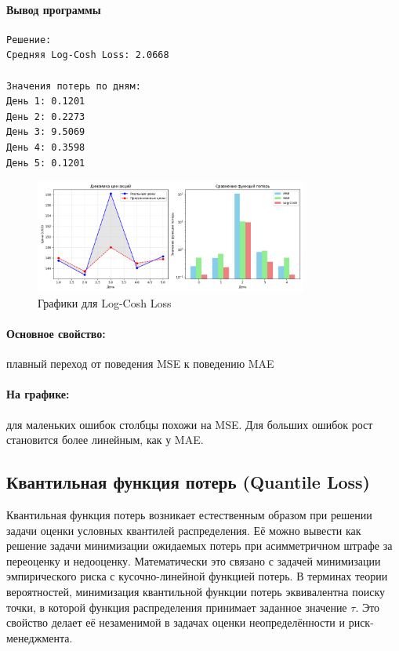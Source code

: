 \documentclass[12pt]{article}
\theoremstyle{definition}
\theoremstyle{definition}
\theoremstyle{definition}
\theoremstyle{remark}
\theoremstyle{remark}
\begin{document}
\paragraph{Вывод программы}
\begin{verbatim}
Решение:
Средняя Log-Cosh Loss: 2.0668

Значения потерь по дням:
День 1: 0.1201
День 2: 0.2273
День 3: 9.5069
День 4: 0.3598
День 5: 0.1201
\end{verbatim}
\begin{figure}[h!]
    \centering
    \includegraphics[width=0.8\textwidth]{imgs/log_cosh.png}
    \caption{Графики для Log-Cosh Loss}
\end{figure}

\paragraph{Основное свойство:} плавный переход от поведения MSE к поведению MAE

\paragraph{На графике:} для маленьких ошибок столбцы похожи на MSE. Для больших ошибок рост становится более линейным, как у MAE.

\subsection{Квантильная функция потерь (Quantile Loss)}

Квантильная функция потерь возникает естественным образом при решении задачи оценки условных квантилей распределения. Её можно вывести как решение задачи минимизации ожидаемых потерь при асимметричном штрафе за переоценку и недооценку. Математически это связано с задачей минимизации эмпирического риска с кусочно-линейной функцией потерь. В терминах теории вероятностей, минимизация квантильной функции потерь эквивалентна поиску точки, в которой функция распределения принимает заданное значение $\tau$. Это свойство делает её незаменимой в задачах оценки неопределённости и риск-менеджмента.
\end{document}

